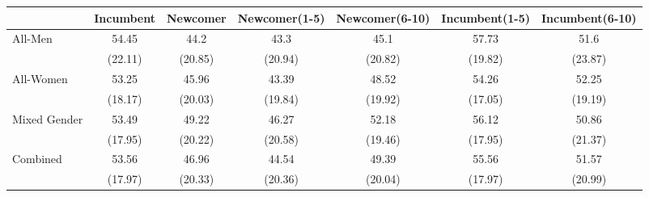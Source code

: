 
\begin{tabular}{l*{6}{c}}
\toprule
                & Incumbent & Newcomer & Newcomer(1-5) & Newcomer(6-10) &  Incumbent(1-5) & Incumbent(6-10)\\
\midrule
All-Men      & 54.45  & 44.2  & 43.3   &   45.1  & 57.73 & 51.6 \\
                &(22.11) &(20.85)& (20.94) & (20.82)  &(19.82)&(23.87)\\
\addlinespace
All-Women&   53.25 &    45.96 &  43.39  &  48.52  &  54.26&   52.25  \\
                & (18.17) & (20.03)&  (19.84)&  (19.92)&  (17.05)& (19.19)\\
\addlinespace
Mixed Gender     &    53.49&      49.22  & 46.27  & 52.18  &    56.12&    50.86 \\
                &   (17.95)&   (20.22)&  (20.58)&  (19.46) &   (17.95)&   (21.37) \\
\addlinespace
Combined &    53.56&     46.96 &   44.54  & 49.39  &  55.56 &    51.57\\
                &  (17.97)&  (20.33)&  (20.36)&  (20.04)&  (17.97)&  (20.99)\\

\bottomrule
\end{tabular}
